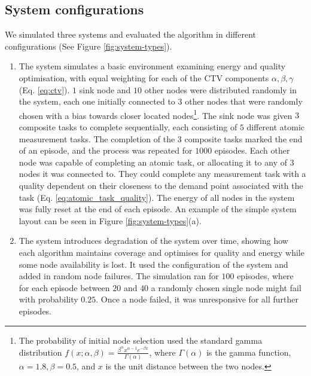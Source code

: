 \subsection{System configurations}
We simulated three systems and evaluated the algorithm in different configurations (See Figure \ref{fig:system-types}).  
\begin{enumerate}
	\item The \simulationSimple{}{} system simulates a basic environment examining energy and quality optimisation, with  equal weighting for each of the CTV components $\alpha, \beta, \gamma$ (Eq. \ref{eq:ctv}). $1$ sink node and $10$ other nodes were distributed randomly in the system, each one initially connected to $3$ other nodes that were randomly chosen with a bias towards closer located nodes\footnote{
		The probability of initial node selection used the standard gamma distribution $f(x; \alpha, \beta) = \frac{\beta^{\alpha} x^{\alpha-1}e^{- \beta x}}   {\Gamma(\alpha)}$, where $\Gamma(\alpha)$ is the  gamma function, $\alpha=1.8, \beta=0.5$, and $x$ is the unit distance between the two nodes.
	}. 
	The sink node was given $3$ composite tasks to complete sequentially, each consisting of $5$ different atomic measurement tasks. The completion of the $3$ composite tasks marked the end of an episode, and the process was repeated for $1000$ episodes. Each other node was capable of completing an atomic task, or allocating it to any of $3$ nodes it was connected to. They could complete any measurement task with a quality dependent on their closeness to the demand point associated with the task (Eq. \ref{eq:atomic_task_quality}). The energy of all nodes in the system was fully reset at the end of each episode. An example of the simple system layout can be seen in Figure \ref{fig:system-types}(a). 

	\item The \simulationNodeFailure{}{} system introduces degradation of the system over time, showing how each algorithm maintains coverage and optimises for quality and energy while some node availability is lost. It used the configuration of the \simulationSimple{}{} system and added in random node failures. The simulation ran for $100$ episodes, where for each episode between $20$ and $40$  a randomly chosen single node might fail with probability $0.25$. Once a node failed, it was unresponsive for all further episodes. 
	

\end{enumerate}
